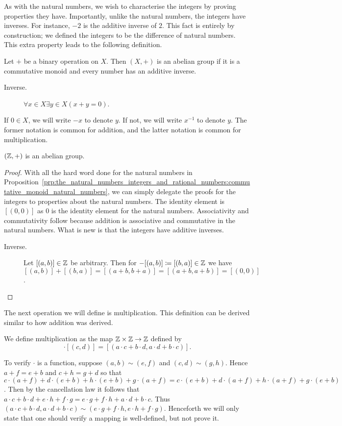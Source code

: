\documentclass[../main.tex]{subfiles}
\begin{document}
As with the natural numbers, we wish to characterise the integers by proving properties they have. Importantly, unlike the natural numbers, the integers have inverses. For instance, $-2$ is the additive inverse of $2$. This fact is entirely by construction; we defined the integers to be the difference of natural numbers. This extra property leads to the following definition.
\begin{definition}
    Let $+$ be a binary operation on $X$. Then $(X,+)$ is an abelian group if it is a commutative monoid and every number has an additive inverse.
    \begin{description}
        \item[Inverse.] $\forall x\in X\exists y\in X(x+y=0)$.
    \end{description}
    If $0\in X$, we will write $-x$ to denote $y$. If not, we will write $x^{-1}$ to denote $y$. The former notation is common for addition, and the latter notation is common for multiplication.
\end{definition}
\begin{proposition}\label{prp:the_natural_numbers_integers_and_rational_numbers:abelian_group_integers}
    $(\mathbb{Z},+)$ is an abelian group.
\end{proposition}
\begin{proof}
    With all the hard word done for the natural numbers in Proposition~\ref{prp:the_natural_numbers_integers_and_rational_numbers:commutative_monoid_natural_numbers}, we can simply delegate the proofs for the integers to properties about the natural numbers. The identity element is $[(0,0)]$ as $0$ is the identity element for the natural numbers. Associativity and commutativity follow because addition is associative and commutative in the natural numbers. What is new is that the integers have additive inverses.
    \begin{description}
        \item[Inverse.] Let $[(a,b)]\in\mathbb{Z}$ be arbitrary. Then for $-[(a,b)]\coloneq[(b,a)]\in\mathbb{Z}$ we have $[(a,b)]+[(b,a)]=[(a+b,b+a)]=[(a+b,a+b)]=[(0,0)]$.
    \end{description}
\end{proof}
The next operation we will define is multiplication. This definition can be derived similar to how addition was derived.
\begin{definition}
    We define multiplication as the map $\mathbb{Z}\times\mathbb{Z}\to\mathbb{Z}$ defined by
    \begin{equation*}
        [(a,b)]\cdot[(c,d)]=[(a\cdot c+b\cdot d,a\cdot d+b\cdot c)].
    \end{equation*}
\end{definition}
To verify $\cdot$ is a function, suppose $(a,b)\sim(e,f)$ and $(c,d)\sim(g,h)$. Hence $a+f=e+b$ and $c+h=g+d$ so that $c\cdot(a+f)+d\cdot(e+b)+h\cdot(e+b)+g\cdot(a+f)=c\cdot(e+b)+d\cdot(a+f)+h\cdot(a+f)+g\cdot(e+b)$. Then by the cancellation law it follows that $a\cdot c+b\cdot d+e\cdot h+f\cdot g=e\cdot g+f\cdot h+a\cdot d+b\cdot c$. Thus $(a\cdot c+b\cdot d,a\cdot d+b\cdot c)\sim(e\cdot g+f\cdot h,e\cdot h+f\cdot g)$. Henceforth we will only state that one should verify a mapping is well-defined, but not prove it.
\end{document}
